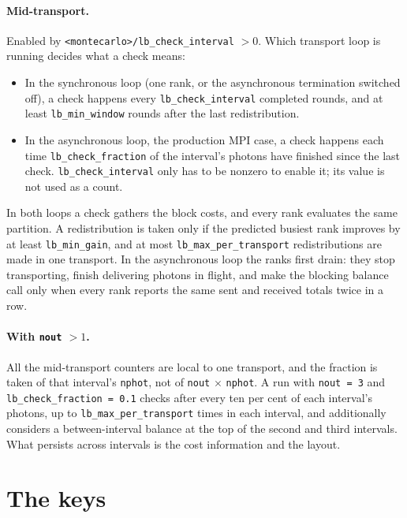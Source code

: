 \documentclass[11pt]{article}
\newcommand{\key}[1]{\texttt{#1}}
\begin{document}
\paragraph{Mid-transport.}
Enabled by \key{<montecarlo>/lb\_check\_interval} $> 0$. Which transport loop is running
decides what a check means:
\begin{itemize}
  \item In the synchronous loop (one rank, or the asynchronous termination switched
    off), a check happens every \key{lb\_check\_interval} completed rounds, and at
    least \key{lb\_min\_window} rounds after the last redistribution.
  \item In the asynchronous loop, the production MPI case, a check happens each time
    \key{lb\_check\_fraction} of the interval's photons have finished since the last
    check. \key{lb\_check\_interval} only has to be nonzero to enable it; its value is
    not used as a count.
\end{itemize}
In both loops a check gathers the block costs, and every rank evaluates the same
partition. A redistribution is taken only if the predicted busiest rank improves by at
least \key{lb\_min\_gain}, and at most \key{lb\_max\_per\_transport} redistributions are
made in one transport. In the asynchronous loop the ranks first drain: they stop
transporting, finish delivering photons in flight, and make the blocking balance call
only when every rank reports the same sent and received totals twice in a row.

\paragraph{With \key{nout} $> 1$.}
All the mid-transport counters are local to one transport, and the fraction is taken of
that interval's \key{nphot}, not of \key{nout} $\times$ \key{nphot}. A run with
\key{nout = 3} and \key{lb\_check\_fraction = 0.1} checks after every ten per cent of
each interval's photons, up to \key{lb\_max\_per\_transport} times in each interval, and
additionally considers a between-interval balance at the top of the second and third
intervals. What persists across intervals is the cost information and the layout.

\section{The keys}
\end{document}
